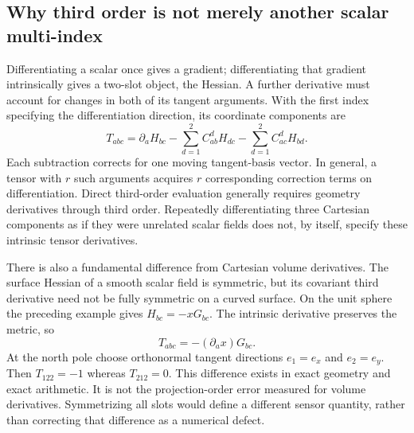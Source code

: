 \subsection{Why third order is not merely another scalar multi-index}
Differentiating a scalar once gives a gradient; differentiating that gradient
intrinsically gives a two-slot object, the Hessian. A further derivative must
account for changes in both of its tangent arguments. With the first index
specifying the differentiation direction, its coordinate components are
\begin{equation}
 T_{abc}=\partial_aH_{bc}
      -\sum_{d=1}^2 C^d_{ab}H_{dc}
      -\sum_{d=1}^2 C^d_{ac}H_{bd}.
 \label{eq:app-third-covariant}
\end{equation}
Each subtraction corrects for one moving tangent-basis vector. In general,
a tensor with $r$ such arguments acquires $r$ corresponding correction
terms on differentiation. Direct third-order evaluation generally requires
geometry derivatives through third order. Repeatedly differentiating three
Cartesian components as if they were unrelated scalar fields does not, by
itself, specify these intrinsic tensor derivatives.

There is also a fundamental difference from Cartesian volume derivatives.
The surface Hessian of a smooth scalar field is symmetric, but its covariant
third derivative need not be fully symmetric on a curved surface. On the
unit sphere the preceding example gives $H_{bc}=-xG_{bc}$. The intrinsic
derivative preserves the metric, so
\begin{equation}
 T_{abc}=-(\partial_a x)G_{bc}.
\end{equation}
At the north pole choose orthonormal tangent directions $e_1=e_x$ and
$e_2=e_y$. Then $T_{122}=-1$ whereas $T_{212}=0$. This difference exists
in exact geometry and exact arithmetic. It is not the projection-order
error measured for volume derivatives. Symmetrizing all slots would define
a different sensor quantity, rather than correcting that difference as a
numerical defect.

